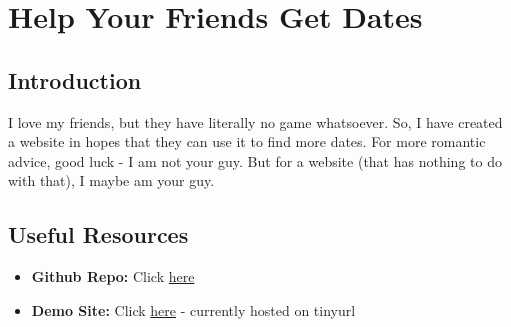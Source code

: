 \section{Help Your Friends Get Dates}
\subsection{Introduction}
I love my friends, but they have literally no game whatsoever. So, I have created a website in hopes that they can use it to find more dates.
For more romantic advice, good luck - I am not your guy. But for a website (that has nothing to do with that), I maybe am your guy.
\subsection{Useful Resources}
\begin{itemize}
    \item \textbf{Github Repo:} Click \href{https://github.com/connorli18/helpyourfriendsgetdates?tab=readme-ov-file}{here}
    \item \textbf{Demo Site:} Click \href{https://helpyourfriendsgetdates.tiiny.site/}{here} - currently hosted on tinyurl
\end{itemize}